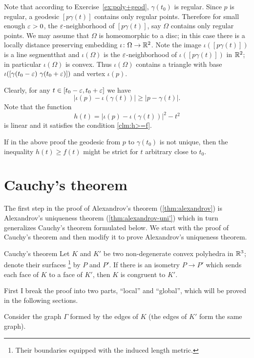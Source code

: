 Note that according to Exercise~\ref{ex:poly+geod}, 
$\gamma(t_0)$ is regular.
Since $p$ is regular,
a geodesic $[p\gamma(t)]$ contains only regular points.
Therefore for small enough $\varepsilon>0$,
 the $\varepsilon$-neighborhood of $[p\gamma(t)]$, say $\Omega$ contains only regular points. 
We may assume that $\Omega$ is homeomorphic to a disc;
in this case there is a locally distance preserving embedding $\iota\colon\Omega\to\mathbb{R}^2$.
Note the image $\iota([p\gamma(t)])$ is a line segmentthat 
and $\iota(\Omega)$ is the $\varepsilon$-neighborhood of $\iota([p\gamma(t)])$ in $\mathbb{R}^2$;
in particular $\iota(\Omega)$ is convex.
Thus $\iota(\Omega)$ contains a triangle with  base $\iota([\gamma(t_0-\varepsilon)\ \gamma(t_0+\varepsilon)])$  and vertex $\iota(p)$.

Clearly, for any $t\in[t_0-\varepsilon,t_0+\varepsilon]$ 
we have 
$$|\iota(p)-\iota(\gamma(t))|\ge|p-\gamma(t)|.$$
Note that
the function
$$h(t)= |\iota(p)-\iota(\gamma(t))|^2-t^2$$
is linear and it 
satisfies the condition \ref{clm:h>=f}.
\qeds

If in the above proof the geodesic from $p$ to $\gamma(t_0)$ is not unique,
then the inequality $h(t)\ge f(t)$ might be strict for $t$ arbitrary close to $t_0$.


\section{Cauchy's theorem}

The first step in the proof of Alexandrov's theorem (\ref{thm:alexandrov}) 
is Alexandrov's uniqueness theorem (\ref{thm:alexandrov-uni'}) 
which in turn generalizes Cauchy's theorem formulated below.
We start with the proof of Cauchy's theorem and then modify it to prove Alexandrov's uniqueness theorem.
 
\begin{thm}{Cauchy's theorem}\label{thm:cauchy} Let $K$ and $K'$ be two non-degenerate convex polyhedra in $\mathbb{R}^3$;
denote their surfaces%
\footnote{Their boundaries equipped with the induced length metric.} 
by $P$ and $P'$.
If there is an isometry $P\to P'$ which sends each face of $K$ to a face of $K'$,
then $K$ is congruent to $K'$.
\end{thm}


First I break the proof into two parts, ``local'' and ``global'',
which will be proved in the following sections.

Consider the graph $\Gamma$ formed by the edges of $K$ 
(the edges of $K'$ form the same graph).
 
